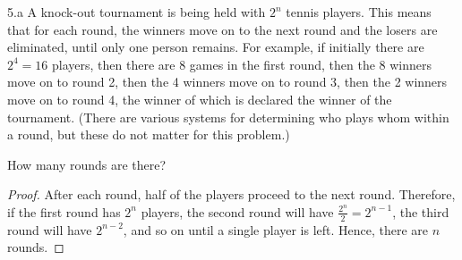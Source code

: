 \begin{exercise}{5.a}
A knock-out tournament is being held with $2^n$ tennis players. This means that for each
round, the winners move on to the next round and the losers are eliminated, until only
one person remains. For example, if initially there are $2^4 = 16$ players, then there are
8 games in the first round, then the 8 winners move on to round 2, then the 4 winners
move on to round 3, then the 2 winners move on to round 4, the winner of which is
declared the winner of the tournament. (There are various systems for determining who
plays whom within a round, but these do not matter for this problem.)

\vspace{1em}
How many rounds are there?
\end{exercise}

\begin{proof}
    After each round, half of the players proceed to the next round. Therefore, if the first round has $2^n$ players, the second round will have $\frac{2^n}{2}=2^{n-1}$, the third round will have $2^{n-2}$, and so on until a single player is left. Hence, there are $n$ rounds.
\end{proof}


